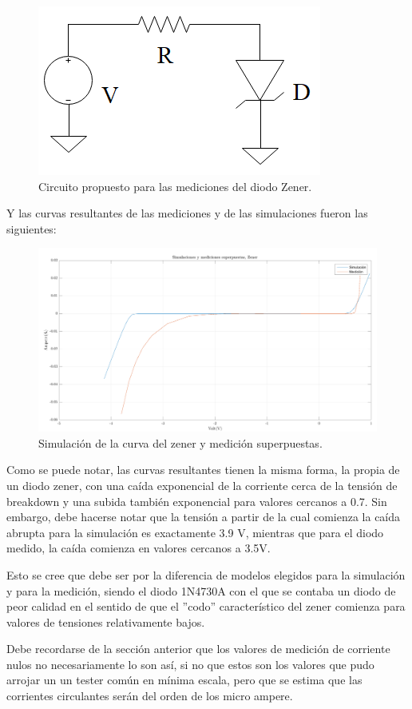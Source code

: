 \documentclass[../../e1_tp1_main.tex]{subfiles}
\begin{document}
	\begin{figure}[H]	%
		\centering
		\includegraphics[scale=1.2]{imagenes/circuito_zener.png}
		\caption{Circuito propuesto para las mediciones del diodo Zener.}
		\label{fig:ej5_circuito_zener}
	\end{figure}

	Y las curvas resultantes de las mediciones y de las simulaciones fueron las siguientes:
	 
\begin{figure}[H]	%
	\centering
	\includegraphics[scale=0.2]{imagenes/zener_simulacion_medicion.png}
	\caption{Simulación de la curva del zener y medición superpuestas.}
	\label{fig:ej5_zener_simulacion_medicion}
\end{figure}
	
	Como se puede notar, las curvas resultantes tienen la misma forma, la propia de un diodo zener, con una caída exponencial de la corriente cerca de la tensión de breakdown y una subida también exponencial para valores cercanos a 0.7. Sin embargo, debe hacerse notar que la tensión a partir de la cual comienza la caída abrupta para la simulación es exactamente 3.9 V, mientras que para el diodo medido, la caída comienza en valores cercanos a 3.5V.\par
	 Esto se cree que debe ser por la diferencia de modelos elegidos para la simulación y para la medición, siendo el diodo 1N4730A con el que se contaba un diodo de peor calidad en el sentido de que el ''codo'' característico del zener comienza para valores de tensiones relativamente bajos.\par 
Debe recordarse de la sección anterior que los valores de medición de corriente nulos no necesariamente lo son así, si no que estos son los valores que pudo arrojar un un tester común en mínima escala, pero que se estima que las corrientes circulantes serán del orden de los micro ampere. \par
\end{document}
